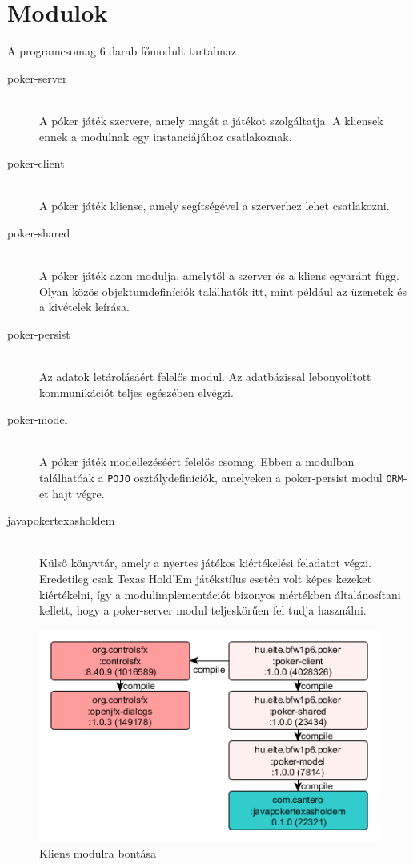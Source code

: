 \section{Modulok}
A programcsomag 6 darab főmodult tartalmaz
\begin{description}
  \item[poker-server] \hfill \\
  A póker játék szervere, amely magát a játékot szolgáltatja. A kliensek ennek a modulnak egy instanciájához csatlakoznak.
  \item[poker-client] \hfill \\
  A póker játék kliense, amely segítségével a szerverhez lehet csatlakozni.
  \item[poker-shared] \hfill \\
   A póker játék azon modulja, amelytől a szerver és a kliens egyaránt függ. Olyan közös objektumdefiníciók találhatók itt, mint például az üzenetek és a kivételek leírása.
   \item[poker-persist] \hfill \\
   Az adatok letárolásáért felelős modul. Az adatbázissal lebonyolított kommunikációt teljes egészében elvégzi.
   \item[poker-model] \hfill \\
   A póker játék modellezéséért felelős csomag. Ebben a modulban találhatóak a \texttt{POJO} \cite{pojo} osztálydefiníciók, amelyeken a poker-persist modul \texttt{ORM}-et \cite{orm} hajt végre.
   \item[javapokertexasholdem] \hfill \\
   Külső könyvtár, amely a nyertes játékos kiértékelési feladatot végzi. Eredetileg csak Texas Hold'Em játékstílus esetén volt képes kezeket kiértékelni, így a modulimplementációt bizonyos mértékben általánosítani kellett, hogy a poker-server modul teljeskörűen fel tudja használni.
\end{description}
\begin{figure}[h!]
	\caption{Kliens modulra bontása}
	\label{fig:client_modul}
	\centering
	\includegraphics[width=\linewidth]{developer-documentation/images/poker-client-deps.png}
\end{figure}
